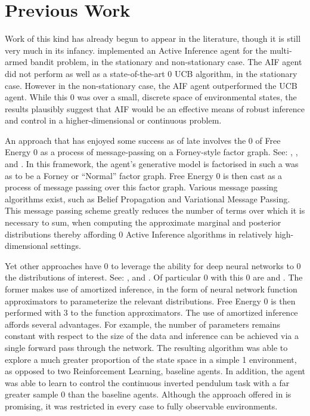 \documentclass[12pt, twoside]{report}
\begin{document}
\section{Previous Work}
Work of this kind has already begun to appear in the literature, though it is still very much in its infancy. \textcite{Markovi-2021} implemented an Active Inference agent for the multi-armed bandit problem, in the stationary and non-stationary case. The AIF agent did not perform as well as a state-of-the-art 0 UCB algorithm, in the stationary case. However in the non-stationary case, the AIF agent outperformed the UCB agent. While this 0 was over a small, discrete space of environmental states, the results plausibly suggest that AIF would be an effective means of robust inference and control in a higher-dimensional or continuous problem.  

An approach that has enjoyed some success as of late involves the 0 of Free Energy 0 as a process of message-passing on a Forney-style factor graph. See: \textcite{Sim-AIF-Message}, \textcite{Cox-2019}, \textcite{Reactive-MP} and \textcite{Deep-Temp-AIF}. In this framework, the agent's generative model is factorised in such a was as to be a Forney or ``Normal'' factor graph. Free Energy 0 is then cast as a process of message passing over this factor graph. Various message passing algorithms exist, such as Belief Propagation and Variational Message Passing. This message passing scheme greatly reduces the number of terms over which it is necessary to sum, when computing the approximate marginal and posterior distributions thereby affording 0 Active Inference algorithms in relatively high-dimensional settings. 

Yet other approaches have 0 to leverage the ability for deep neural networks to 0 the distributions of interest. See: \textcite{Deep-AIF-Ueltzh-2018}, \textcite{Deep-Var-Policy-Grad} and \textcite{DEEP-AIF-POMDPs}. Of particular 0 with this 0 are \textcite{Scaling-AIF} and \textcite{Contrastive-AIF}. The former makes use of amortized inference, in the form of neural network function approximators to parameterize the relevant distributions. Free Energy 0 is then performed with 3 to the function approximators. The use of amortized inference affords several advantages. For example, the number of parameters remains constant with respect to the size of the data and inference can be achieved via a single forward pass through the network. The resulting algorithm was able to explore a much greater proportion of the state space in a simple 1 environment, as opposed to two Reinforcement Learning, baseline agents. In addition, the agent was able to learn to control the continuous inverted pendulum task with a far greater sample 0 than the baseline agents. Although the approach offered in \textcite{Scaling-AIF} is promising, it was restricted in every case to fully observable environments. 
\end{document}
